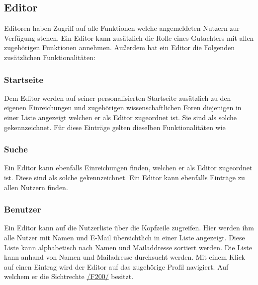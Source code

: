 \subsection{Editor}\label{funkt:editor}
Editoren haben Zugriff auf alle Funktionen welche angemeldeten Nutzern zur Verfügung stehen. Ein Editor kann zusätzlich
die Rolle eines Gutachters mit allen zugehörigen Funktionen annehmen.
Außerdem hat ein Editor die Folgenden zusätzlichen Funktionalitäten:

\subsubsection{Startseite}
\begin{description}
     Dem Editor werden auf seiner personalisierten Startseite zusätzlich zu den eigenen
    Einreichungen und zugehörigen wissenschaftlichen Foren diejenigen in einer
    Liste angezeigt welchen er als Editor zugeordnet ist. Sie sind als solche gekennzeichnet.
    Für diese Einträge gelten dieselben Funktionalitäten wie  %
\end{description}

\subsubsection{Suche}
\begin{description}
     Ein Editor kann ebenfalls Einreichungen finden, welchen er als Editor zugeordnet ist.
    Diese sind als solche gekennzeichnet.
     Ein Editor kann ebenfalls Einträge zu allen Nutzern finden.
\end{description}

\subsubsection{Benutzer}
\begin{description}
     Ein Editor kann auf die Nutzerliste über die Kopfzeile zugreifen.
     Hier werden ihm alle Nutzer mit Namen und E-Mail übersichtlich in einer Liste angezeigt.
     Diese Liste kann alphabetisch nach Namen und Mailaddresse sortiert werden.
     Die Liste kann anhand von Namen und Mailadresse durchsucht werden.
     Mit einem Klick auf einen Eintrag wird der Editor auf das zugehörige Profil navigiert.
    Auf welchem er die Sichtrechte \hyperref[funkt:200]{/F200/} besitzt.
\end{description}

